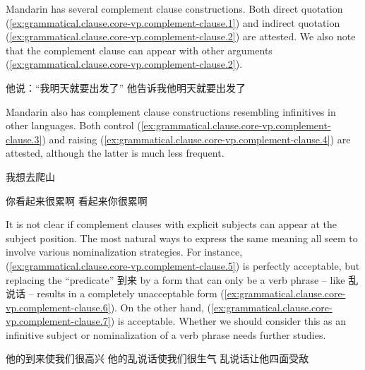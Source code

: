 \documentclass[UTF8, a4paper, oneside, scheme=plain, 12pt]{ctexrep}
\begin{document}
Mandarin has several complement clause constructions.
Both direct quotation (\ref{ex:grammatical.clause.core-vp.complement-clause.1}) and indirect quotation (\ref{ex:grammatical.clause.core-vp.complement-clause.2}) are attested.
We also note that the complement clause can appear with other arguments 
(\ref{ex:grammatical.clause.core-vp.complement-clause.2}).

\begin{exe}
    \ex\label{ex:grammatical.clause.core-vp.complement-clause.1} 他说：“我明天就要出发了”
    \ex\label{ex:grammatical.clause.core-vp.complement-clause.2} 他告诉我他明天就要出发了
\end{exe}

Mandarin also has complement clause constructions resembling infinitives in other languages.
Both control (\ref{ex:grammatical.clause.core-vp.complement-clause.3})
and raising (\ref{ex:grammatical.clause.core-vp.complement-clause.4}) are attested,
although the latter is much less frequent.

\begin{exe}
    \ex\label{ex:grammatical.clause.core-vp.complement-clause.3} 我想去爬山
    \ex\label{ex:grammatical.clause.core-vp.complement-clause.4} \begin{xlist}
        \ex 你看起来很累啊
        \ex 看起来你很累啊
    \end{xlist}
\end{exe}

It is not clear if complement clauses with explicit subjects can appear at the subject position.
The most natural ways to express the same meaning all seem to involve various nominalization strategies.
For instance, (\ref{ex:grammatical.clause.core-vp.complement-clause.5}) is perfectly acceptable,
but replacing the ``predicate'' 到来 by a form that can only be a verb phrase -- like 乱说话 --
results in a completely unacceptable form (\ref{ex:grammatical.clause.core-vp.complement-clause.6}).
On the other hand, (\ref{ex:grammatical.clause.core-vp.complement-clause.7})
is acceptable.
Whether we should consider this as an infinitive subject
or nominalization of a verb phrase needs further studies.

\begin{exe}
    \ex\label{ex:grammatical.clause.core-vp.complement-clause.5} 他的到来使我们很高兴
    \ex\label{ex:grammatical.clause.core-vp.complement-clause.6} 他的乱说话使我们很生气
    \ex\label{ex:grammatical.clause.core-vp.complement-clause.7} 乱说话让他四面受敌
\end{exe}
\end{document}
